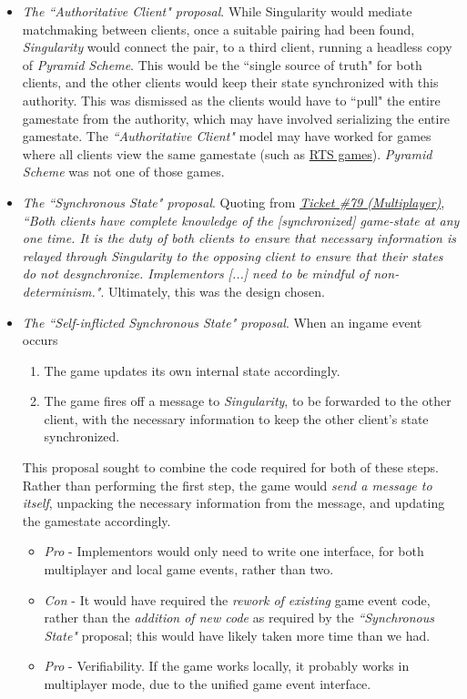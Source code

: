 \documentclass[11pt,a4paper]{report}
\begin{document}
\begin{itemize}
    \item \textit{The ``Authoritative Client" proposal}. While Singularity would mediate matchmaking between clients, once a suitable pairing had been found, \textit{Singularity} would connect the pair, to a third client, running a headless copy of \textit{Pyramid Scheme}. This would be the ``single source of truth" for both clients, and the other clients would keep their state synchronized with this authority. This was dismissed as the clients would have to ``pull" the entire gamestate from the authority, which may have involved serializing the entire gamestate. The \textit{``Authoritative Client"} model may have worked for games where all clients view the same gamestate (such as \href{https://en.wikipedia.org/wiki/Real-time_strategy}{RTS games}). \textit{Pyramid Scheme} was not one of those games.
    \item \textit{The ``Synchronous State" proposal}. Quoting from \href{https://github.com/UQdeco2800/deco2800-2016-pyramidscheme/issues/79}{\textit{Ticket \#79 (Multiplayer)}}, \textit{``Both clients have complete knowledge of the [synchronized] game-state at any one time. It is the duty of both clients to ensure that necessary information is relayed through Singularity to the opposing client to ensure that their states do not desynchronize. Implementors [...] need to be mindful of non-determinism."}. Ultimately, this was the design chosen.
    \item \textit{The ``Self-inflicted Synchronous State" proposal}. When an ingame event occurs
        \begin{enumerate}
            \item The game updates its own internal state accordingly.
            \item The game fires off a message to \textit{Singularity}, to be forwarded to the other client, with the necessary information to keep the other client's state synchronized.
        \end{enumerate} This proposal sought to combine the code required for both of these steps. Rather than performing the first step, the game would \textit{send a message to itself}, unpacking the necessary information from the message, and updating the gamestate accordingly.

        \begin{itemize}
            \item \textit{Pro} - Implementors would only need to write one interface, for both multiplayer and local game events, rather than two.
            \item \textit{Con} - It would have required the \textit{rework of existing} game event code, rather than the \textit{addition of new code} as required by the \textit{``Synchronous State"} proposal; this would have likely taken more time than we had.
            \item \textit{Pro} - Verifiability. If the game works locally, it probably works in multiplayer mode, due to the unified game event interface.
        \end{itemize}
\end{itemize}
\end{document}
